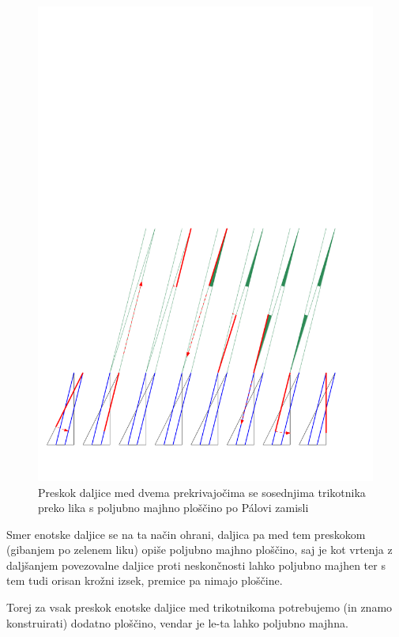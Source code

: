 \documentclass[a4paper, 12pt]{article}
\begin{document}
\begin{figure}[h!]
    \centering
    \includegraphics[width=\textwidth]{ipe_slike/pal.pdf}
    \caption{Preskok daljice med dvema prekrivajočima se sosednjima trikotnika preko lika s poljubno majhno ploščino po Pálovi zamisli}
    \label{pal}
\end{figure}

Smer enotske daljice se na ta način ohrani, daljica pa med tem preskokom (gibanjem po zelenem liku) opiše poljubno majhno ploščino, saj je kot vrtenja z daljšanjem povezovalne daljice proti neskončnosti lahko poljubno majhen ter s tem tudi orisan krožni izsek, premice pa nimajo ploščine.

Torej za vsak preskok enotske daljice med trikotnikoma potrebujemo (in znamo konstruirati) dodatno ploščino, vendar je le-ta lahko poljubno majhna.

\end{document}
